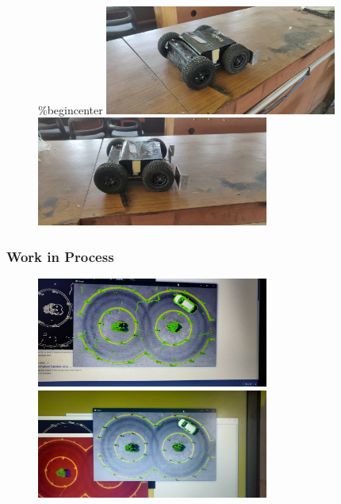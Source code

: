 \begin{figure}[!tbh] %
\%begin{center}
	\includegraphics[width = 3in]{images/botpid7.jpg}
	\hspace{.5cm}
	\includegraphics[width = 3in]{images/botpic8.jpg}
	\label{figSample1} %
\end{figure}



\subsubsection{Work in Process}
\begin{figure}[!tbh] %
	\includegraphics[width = 3in]{images/work in process1.jpg} 
	\hspace{.5cm}
	\includegraphics[width = 3in]{images/work in process2.jpg} 
	\label{figSample1} %
\end{figure}
\renewcommand\bibname{References} %



